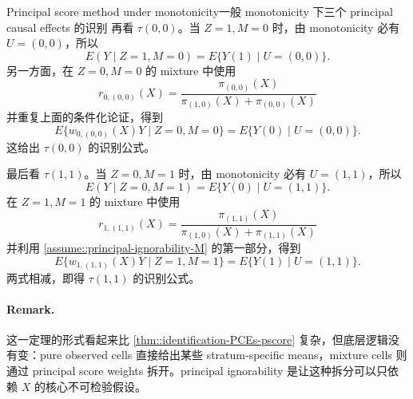 \begin{exercisesolution}{Principal score method under monotonicity}{一般 monotonicity 下三个 principal causal effects 的识别}
再看 $\tau(0,0)$。当 $Z=1,M=0$ 时，由 monotonicity 必有 $U=(0,0)$，所以
\[
E(Y\mid Z=1,M=0)=E\{Y(1)\mid U=(0,0)\}.
\]
另一方面，在 $Z=0,M=0$ 的 mixture 中使用
\[
r_{0,(0,0)}(X)
=\frac{\pi_{(0,0)}(X)}{\pi_{(1,0)}(X)+\pi_{(0,0)}(X)}
\]
并重复上面的条件化论证，得到
\[
E\{w_{0,(0,0)}(X)Y\mid Z=0,M=0\}
=E\{Y(0)\mid U=(0,0)\}.
\]
这给出 $\tau(0,0)$ 的识别公式。

最后看 $\tau(1,1)$。当 $Z=0,M=1$ 时，由 monotonicity 必有 $U=(1,1)$，所以
\[
E(Y\mid Z=0,M=1)=E\{Y(0)\mid U=(1,1)\}.
\]
在 $Z=1,M=1$ 的 mixture 中使用
\[
r_{1,(1,1)}(X)
=\frac{\pi_{(1,1)}(X)}{\pi_{(1,0)}(X)+\pi_{(1,1)}(X)}
\]
并利用 \cref{assume::principal-ignorability-M} 的第一部分，得到
\[
E\{w_{1,(1,1)}(X)Y\mid Z=1,M=1\}
=E\{Y(1)\mid U=(1,1)\}.
\]
两式相减，即得 $\tau(1,1)$ 的识别公式。

\paragraph{Remark.}
这一定理的形式看起来比 \cref{thm::identification-PCEs-pscore} 复杂，但底层逻辑没有变：pure observed cells 直接给出某些 stratum-specific means，mixture cells 则通过 principal score weights 拆开。principal ignorability 是让这种拆分可以只依赖 $X$ 的核心不可检验假设。
\end{exercisesolution}

